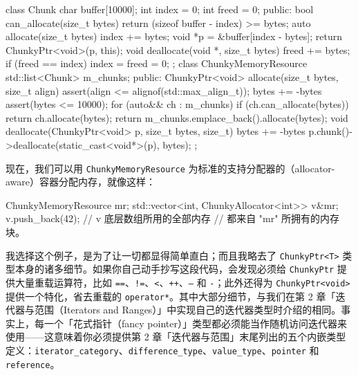 \begin{codebox}[cpp]
    class Chunk {
      char buffer[10000];
      int index = 0;
      int freed = 0;
    public:
      bool can_allocate(size_t bytes) {
        return (sizeof buffer - index) >= bytes;
      }
      auto allocate(size_t bytes) {
        index += bytes;
        void *p = &buffer[index - bytes];
        return ChunkyPtr<void>(p, this);
      }
      void deallocate(void *, size_t bytes) {
        freed += bytes;
        if (freed == index) {
            index = freed = 0;
        }
      }
    };
    class ChunkyMemoryResource {
      std::list<Chunk> m_chunks;
    public:
      ChunkyPtr<void> allocate(size_t bytes, size_t align) {
        assert(align <= alignof(std::max_align_t));
        bytes += -bytes %
        assert(bytes <= 10000);
        for (auto&& ch : m_chunks) {
          if (ch.can_allocate(bytes)) {
            return ch.allocate(bytes);
          }
        }
        return m_chunks.emplace_back().allocate(bytes);
      }
      void deallocate(ChunkyPtr<void> p, size_t bytes, size_t) {
        bytes += -bytes %
        p.chunk()->deallocate(static_cast<void*>(p), bytes);
      }
    };
\end{codebox}

现在，我们可以用 \texttt{Chunky\allowbreak{}Memory\allowbreak{}Resource} 为标准的支持分配器的（allocator-aware）容器分配内存，就像这样：

\begin{codebox}[cpp]
    ChunkyMemoryResource mr;
    std::vector<int, ChunkyAllocator<int>> v{&mr};
    v.push_back(42);
    // v 底层数组所用的全部内存
    // 都来自 "mr" 所拥有的内存块。
\end{codebox}

我选择这个例子，是为了让一切都显得简单直白；而且我略去了 \texttt{Chunky\allowbreak{}Ptr<\allowbreak{}T>\allowbreak{}} 类型本身的诸多细节。如果你自己动手抄写这段代码，会发现必须给 \texttt{Chunky\allowbreak{}Ptr} 提供大量重载运算符，比如 \texttt{==}、\texttt{!=}、\texttt{<}、\texttt{++}、\texttt{--} 和 \texttt{-}；此外还得为 \texttt{Chunky\allowbreak{}Ptr<\allowbreak{}void>\allowbreak{}} 提供一个特化，省去重载的 \texttt{operator*}。其中大部分细节，与我们在第 2 章「迭代器与范围（Iterators and Ranges）」中实现自己的迭代器类型时介绍的相同。事实上，每一个「花式指针（fancy pointer）」类型都必须能当作随机访问迭代器来使用——这意味着你必须提供第 2 章「迭代器与范围」末尾列出的五个内嵌类型定义：\texttt{iterator\_\allowbreak{}category}、\texttt{difference\_\allowbreak{}type}、\texttt{value\_\allowbreak{}type}、\texttt{pointer} 和 \texttt{reference}。

